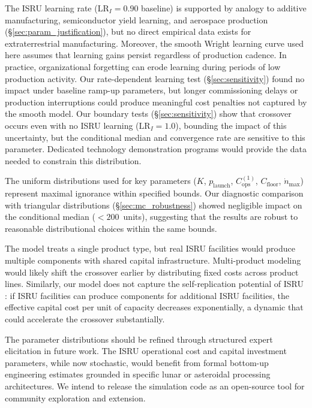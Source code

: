 \documentclass[preprint,12pt]{elsarticle}
\begin{document}
The ISRU learning rate ($\mathrm{LR}_I = 0.90$ baseline) is supported by analogy to additive manufacturing, semiconductor yield learning, and aerospace production (\S\ref{sec:param_justification}), but no direct empirical data exists for extraterrestrial manufacturing. Moreover, the smooth Wright learning curve used here assumes that learning gains persist regardless of production cadence. In practice, organizational forgetting \cite{benkard2000} can erode learning during periods of low production activity. Our rate-dependent learning test (\S\ref{sec:sensitivity}) found no impact under baseline ramp-up parameters, but longer commissioning delays or production interruptions could produce meaningful cost penalties not captured by the smooth model. Our boundary tests (\S\ref{sec:sensitivity}) show that crossover occurs even with no ISRU learning ($\mathrm{LR}_I = 1.0$), bounding the impact of this uncertainty, but the conditional median and convergence rate are sensitive to this parameter. Dedicated technology demonstration programs would provide the data needed to constrain this distribution.

The uniform distributions used for key parameters ($K$, $p_{\mathrm{launch}}$, $C_{\mathrm{ops}}^{(1)}$, $C_{\mathrm{floor}}$, $\dot{n}_{\max}$) represent maximal ignorance within specified bounds. Our diagnostic comparison with triangular distributions (\S\ref{sec:mc_robustness}) showed negligible impact on the conditional median ($<200$~units), suggesting that the results are robust to reasonable distributional choices within the same bounds.

The model treats a single product type, but real ISRU facilities would produce multiple components with shared capital infrastructure. Multi-product modeling would likely shift the crossover earlier by distributing fixed costs across product lines. Similarly, our model does not capture the self-replication potential of ISRU \cite{metzger2013}: if ISRU facilities can produce components for additional ISRU facilities, the effective capital cost per unit of capacity decreases exponentially, a dynamic that could accelerate the crossover substantially.

The parameter distributions should be refined through structured expert elicitation in future work. The ISRU operational cost and capital investment parameters, while now stochastic, would benefit from formal bottom-up engineering estimates grounded in specific lunar or asteroidal processing architectures. We intend to release the simulation code as an open-source tool for community exploration and extension.
\end{document}
